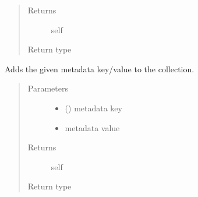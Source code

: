 \documentclass[letterpaper,10pt,english]{sphinxmanual}
\begin{document}
\begin{fulllineitems}
\begin{fulllineitems}
\begin{quote}
\begin{description}
\item[{Returns}] \leavevmode
\sphinxAtStartPar
self

\item[{Return type}] \leavevmode
\sphinxAtStartPar
{\hyperref[\detokenize{autoapi/pine/client/models/index:pine.client.models.CollectionBuilder}]{}}

\end{description}\end{quote}

\end{fulllineitems}


\begin{fulllineitems}
\label{\detokenize{autoapi/pine/client/index:pine.client.CollectionBuilder.metadata}}
\sphinxAtStartPar
Adds the given metadata key/value to the collection.
\begin{quote}\begin{description}
\item[{Parameters}] \leavevmode\begin{itemize}
\item {} 
\sphinxAtStartPar
{} () \textendash{} metadata key

\item {} 
\sphinxAtStartPar
{} \textendash{} metadata value

\end{itemize}

\item[{Returns}] \leavevmode
\sphinxAtStartPar
self

\item[{Return type}] \leavevmode
\sphinxAtStartPar
{\hyperref[\detokenize{autoapi/pine/client/models/index:pine.client.models.CollectionBuilder}]{}}


\end{description}
\end{quote}
\end{fulllineitems}
\end{fulllineitems}
\end{document}

